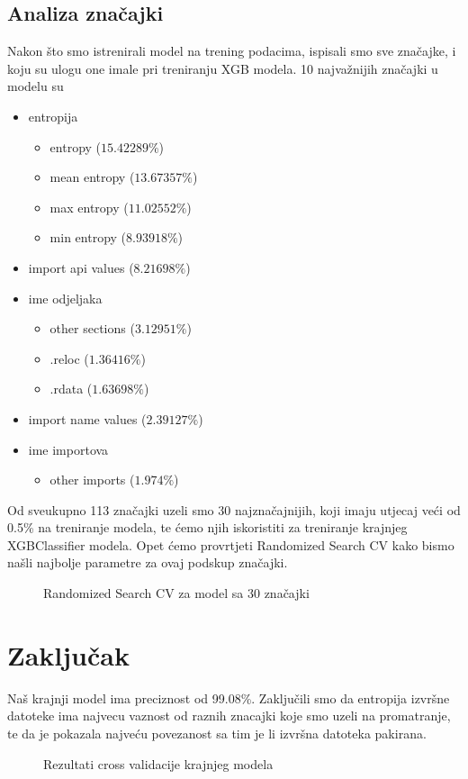 \documentclass[conference]{IEEEtran}
\begin{document}
\subsection{Analiza značajki}
Nakon što smo istrenirali model na trening podacima, ispisali smo sve značajke, i koju su ulogu one imale pri treniranju XGB modela. 10 najvažnijih značajki u modelu su
\begin{itemize}
\item entropija
	\begin{itemize}
	\item entropy ($15.42289\%$)
	\item mean entropy ($13.67357\%$)
	\item max entropy ($11.02552\%$)
	\item min entropy ($8.93918\%$)
	\end{itemize}
\item import api values ($8.21698\%$)
\item ime odjeljaka
	\begin{itemize}
	\item other sections ($3.12951\%$)
	\item .reloc ($1.36416\%$)
	\item .rdata ($1.63698\%$)
	\end{itemize}
\item import name values ($2.39127\%$)
\item ime importova
	\begin{itemize}
	\item other imports ($1.974\%$)
	\end{itemize}
\end{itemize}
Od sveukupno 113 značajki uzeli smo 30 najznačajnijih, koji imaju utjecaj veći od 0.5\% na treniranje modela, te ćemo njih iskoristiti za treniranje krajnjeg XGBClassifier modela. Opet ćemo provrtjeti Randomized Search CV kako bismo našli najbolje parametre za ovaj podskup značajki.
\begin{figure}[h]
\caption{Randomized Search CV za model sa 30 značajki}
\end{figure}
\section{Zaključak}
Naš krajnji model ima preciznost od 99.08\%. Zaključili smo da entropija izvršne datoteke ima najvecu vaznost od raznih znacajki koje smo uzeli na promatranje, te da je pokazala najveću povezanost sa tim je li izvršna datoteka pakirana.
\begin{figure}
\caption{Rezultati cross validacije krajnjeg modela}
\end{figure}
\newpage
\end{document}
